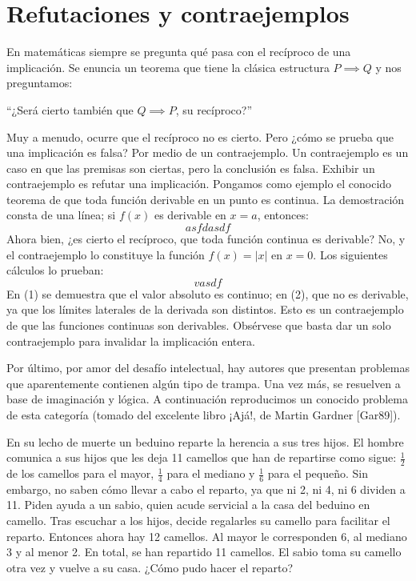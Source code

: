 \section{Refutaciones y contraejemplos}

En matemáticas siempre se pregunta qué pasa con el recíproco de una implicación.
Se enuncia un teorema que tiene la clásica estructura $P\implies Q$ y nos preguntamos:
\begin{center}
    ``¿Será cierto también que $Q\implies P$, su recíproco?''
\end{center}
Muy a menudo, ocurre que el recíproco no es cierto.
Pero ¿cómo se prueba que una implicación es falsa?
Por medio de un contraejemplo.
Un contraejemplo es un caso en que las premisas son ciertas, pero la conclusión es falsa.
Exhibir un contraejemplo es refutar una implicación.
Pongamos como ejemplo el conocido teorema de que toda función derivable en un punto es continua.
La demostración consta de una línea; si $f(x)$ es derivable en $x = a$, entonces:
\[
    asfdasdf
\]
Ahora bien, ¿es cierto el recíproco, que toda función continua es derivable?
No, y el contraejemplo lo constituye la función $f(x) = |x|$ en $x = 0$.
Los siguientes cálculos lo prueban:
\[
    vasdf
\]
En (1) se demuestra que el valor absoluto es continuo;
en (2), que no es derivable, ya que los límites laterales de la derivada son distintos.
Esto es un contraejemplo de que las funciones continuas son derivables.
Obsérvese que basta dar un solo contraejemplo para invalidar la implicación entera.

Por último, por amor del desafío intelectual, hay autores que presentan problemas que aparentemente contienen algún tipo de trampa.
Una vez más, se resuelven a base de imaginación y lógica.
A continuación reproducimos un conocido problema de esta categoría (tomado del excelente libro ¡Ajá!, de Martin Gardner [Gar89]).

\begin{problem}
    En su lecho de muerte un beduino reparte la herencia a sus tres hijos.
    El hombre comunica a sus hijos que les deja 11 camellos que han de repartirse como sigue:
    $\frac{1}{2}$ de los camellos para el mayor, $\frac{1}{4}$ para el mediano y $\frac{1}{6}$ para el pequeño.
    Sin embargo, no saben cómo llevar a cabo el reparto, ya que ni 2, ni 4, ni 6 dividen a 11.
    Piden ayuda a un sabio, quien acude servicial a la casa del beduino en camello.
    Tras escuchar a los hijos, decide regalarles su camello para facilitar el reparto.
    Entonces ahora hay 12 camellos.
    Al mayor le corresponden 6, al mediano 3 y al menor 2.
    En total, se han repartido 11 camellos.
    El sabio toma su camello otra vez y vuelve a su casa.
    ¿Cómo pudo hacer el reparto?
\end{problem}

